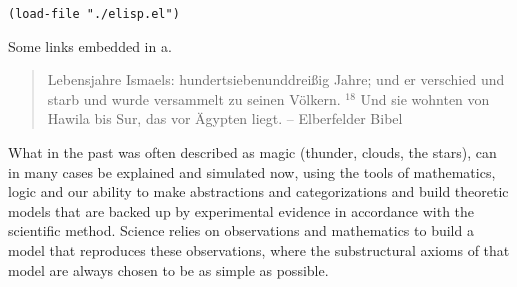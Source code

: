 \documentclass[11pt]{article}
\author{chris}
\date{\today}
\title{}
\begin{document}
\tableofcontents

\begin{verbatim}
(load-file "./elisp.el")
\end{verbatim}

Some \cite[p.22]{elb05} links \cite[p.23]{elb05} embedded \cite[p.24]{elb05} in \cite[p.25]{elb05} a.
\begin{quote}
 Lebensjahre Ismaels: hundertsiebenunddreißig Jahre; und er verschied und starb und wurde versammelt zu seinen Völkern. \({}^{18}\) Und sie wohnten von Hawila bis Sur, das vor Ägypten liegt. 
-- Elberfelder Bibel \cite[p.24]{elb05}
\end{quote}

What in the past was often described as magic (thunder, clouds, the stars), can in many cases be explained and simulated now, using the tools of mathematics, logic and our ability to make abstractions and categorizations and build theoretic models that are backed up by experimental evidence in accordance with the scientific method. Science relies on observations and mathematics to build a model that reproduces these observations, where the substructural axioms of that model are always chosen to be as simple as possible. 
\end{document}
